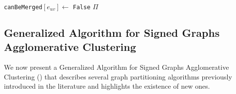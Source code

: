 \begin{algorithm}[t]
\begin{algorithmic}[1]
          \EndFor
        \EndIf
          \State \texttt{canBeMerged}$[e_{uv}] \gets$ \texttt{False}
        \EndIf
      \EndWhile
      \State
      \Return $\Pi$



  \end{algorithmic}
  \label{main_alg}
\end{algorithm}

\subsection{Generalized Algorithm for Signed Graphs Agglomerative Clustering} \label{sec:algorithm}

We now present a Generalized Algorithm for Signed Graphs Agglomerative Clustering (\algname) that describes several graph partitioning algorithms previously introduced in the literature and highlights the existence of new ones.


